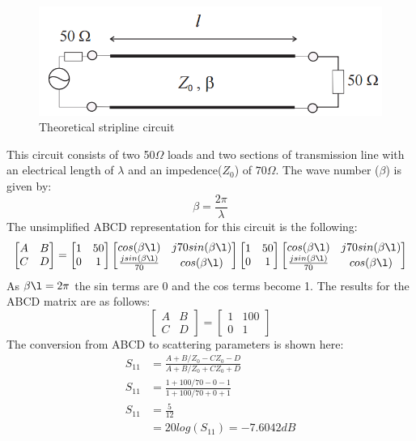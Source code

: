 \documentclass{paper}
\begin{document}
\begin{figure}[H]
	\centering
	\includegraphics[scale=0.5]{IMG/theoretical_circuit}
	\caption{Theoretical stripline circuit}
	\label{fig:theoretical_circuit}
\end{figure}

This circuit consists of two 50$\Omega$ loads and two sections of transmission line with an electrical length of $\lambda$ and an impedence($Z_0$) of $70\Omega$. The wave number ($\beta$) is given by:
$$\beta = \frac{2\pi}{\lambda}$$
The unsimplified ABCD representation for this circuit is the following:
$$\begin{bmatrix}
A & B\\
C & D
\end{bmatrix} = 
\begin{bmatrix}
1 & 50\\
0 & 1
\end{bmatrix}
\begin{bmatrix}
cos(\beta\l) & j70sin(\beta\l)\\
\frac{jsin(\beta\l)}{70} & cos(\beta\l)
\end{bmatrix}
\begin{bmatrix}
1 & 50\\
0 & 1
\end{bmatrix}
\begin{bmatrix}
cos(\beta\l) & j70sin(\beta\l)\\
\frac{jsin(\beta\l)}{70} & cos(\beta\l)
\end{bmatrix}
$$
As $\beta\l=2\pi$ the sin terms are 0 and the cos terms become 1. The results for the ABCD matrix are as follows:
$$\begin{bmatrix}
A & B\\
C & D
\end{bmatrix} = 
\begin{bmatrix}
1 & 100\\
0 & 1
\end{bmatrix}
$$
The conversion from ABCD to scattering parameters is shown here:
\begin{align}
S_{11} &=\frac{A+B/Z_0-CZ_0-D}{A+B/Z_0+CZ_0+D}\\
S_{11} &=\frac{1+100/70-0-1}{1+100/70+0+1}\\
S_{11} &=\frac{5}{12}\\
&= 20log(S_{11})= -7.6042dB
\end{align}
\end{document}
